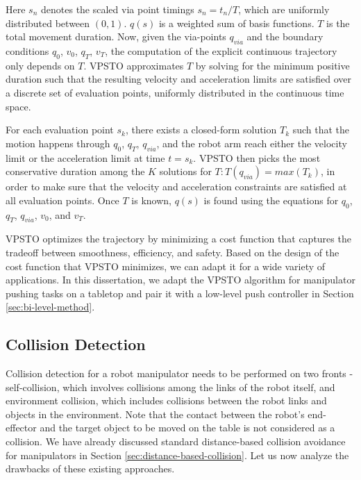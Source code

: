 Here $s_n$ denotes the scaled via point timings $s_n = t_n/T$, which are uniformly distributed between $(0,1)$. $q(s)$ is a weighted sum of basis functions. $T$ is the total movement duration. Now, given the via-points $q_{via}$ and the boundary conditions $q_0$, $v_0$, $q_T$, $v_T$, the computation of the explicit continuous trajectory only depends on $T$. VPSTO approximates $T$ by solving for the minimum positive duration such that the resulting velocity and acceleration limits are satisfied over a discrete set of evaluation points, uniformly distributed in the continuous time space. 

For each evaluation point $s_k$, there exists a closed-form solution $T_k$ such that the motion happens through $q_0$, $q_T$, $q_{via}$, and the robot arm reach either the velocity limit or the acceleration limit at time $t = s_k$. VPSTO then picks the most conservative duration among the $K$ solutions for $T: T(q_{via}) = max(T_k)$, in order to make sure that the velocity and acceleration constraints are satisfied at all evaluation points. Once $T$ is known, $q(s)$ is found using the equations for $q_0$, $q_T$, $q_{via}$, $v_0$, and $v_T$. 

VPSTO optimizes the trajectory by minimizing a cost function that captures the tradeoff between smoothness, efficiency, and safety. Based on the design of the cost function that VPSTO minimizes, we can adapt it for a wide variety of applications. In this dissertation, we adapt the VPSTO algorithm for manipulator pushing tasks on a tabletop and pair it with a low-level push controller in Section \ref{sec:bi-level-method}.

\subsection{Collision Detection}

Collision detection for a robot manipulator needs to be performed on two fronts - self-collision, which involves collisions among the links of the robot itself, and environment collision, which includes collisions between the robot links and objects in the environment. Note that the contact between the robot's end-effector and the target object to be moved on the table is not considered as a collision. We have already discussed standard distance-based collision avoidance for manipulators in Section \ref{sec:distance-based-collision}. Let us now analyze the drawbacks of these existing approaches. 

